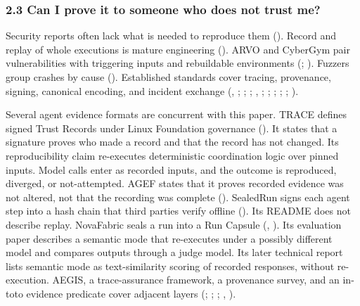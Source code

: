 \documentclass[
  american,
  10pt,
  a4paper,
]{article}
\begin{document}
\subsubsection{2.3 Can I prove it to someone who does not trust
me?}\label{can-i-prove-it-to-someone-who-does-not-trust-me}

Security reports often lack what is needed to reproduce them
(). Record and
replay of whole executions is mature engineering
(). ARVO and
CyberGym pair vulnerabilities with triggering inputs and rebuildable
environments (;
). Fuzzers group
crashes by cause (). Established standards cover tracing, provenance,
signing, canonical encoding, and incident exchange
(,
; ; ; , ;
;
;
;
;
).

Several agent evidence formats are concurrent with this paper. TRACE
defines signed Trust Records under Linux Foundation governance
(). It states that a
signature proves who made a record and that the record has not changed.
Its reproducibility claim re-executes deterministic coordination logic
over pinned inputs. Model calls enter as recorded inputs, and the
outcome is reproduced, diverged, or not-attempted. AGEF states that it
proves recorded evidence was not altered, not that the recording was
complete (). SealedRun
signs each agent step into a hash chain that third parties verify
offline (). Its README does not describe replay. NovaFabric seals a run into
a Run Capsule (,
). Its evaluation
paper describes a semantic mode that re-executes under a possibly
different model and compares outputs through a judge model. Its later
technical report lists semantic mode as text-similarity scoring of
recorded responses, without re-execution. AEGIS, a trace-assurance
framework, a provenance survey, and an in-toto evidence predicate cover
adjacent layers (;
;
;
,
).
\end{document}

